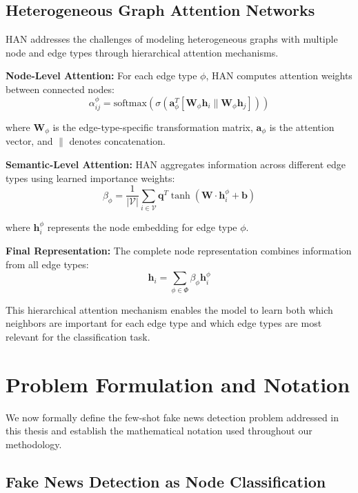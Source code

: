 \subsection{Heterogeneous Graph Attention Networks}

HAN addresses the challenges of modeling heterogeneous graphs with multiple node and edge types through hierarchical attention mechanisms.

\textbf{Node-Level Attention:} For each edge type $\phi$, HAN computes attention weights between connected nodes:
\begin{equation}
\alpha_{ij}^{\phi} = \text{softmax}\left(\sigma\left(\mathbf{a}_{\phi}^T [\mathbf{W}_{\phi} \mathbf{h}_i \| \mathbf{W}_{\phi} \mathbf{h}_j]\right)\right)
\end{equation}

where $\mathbf{W}_{\phi}$ is the edge-type-specific transformation matrix, $\mathbf{a}_{\phi}$ is the attention vector, and $\|$ denotes concatenation.

\textbf{Semantic-Level Attention:} HAN aggregates information across different edge types using learned importance weights:
\begin{equation}
\beta_{\phi} = \frac{1}{|\mathcal{V}|} \sum_{i \in \mathcal{V}} \mathbf{q}^T \tanh(\mathbf{W} \cdot \mathbf{h}_i^{\phi} + \mathbf{b})
\end{equation}

where $\mathbf{h}_i^{\phi}$ represents the node embedding for edge type $\phi$.

\textbf{Final Representation:} The complete node representation combines information from all edge types:
\begin{equation}
\mathbf{h}_i = \sum_{\phi \in \Phi} \beta_{\phi} \mathbf{h}_i^{\phi}
\end{equation}

This hierarchical attention mechanism enables the model to learn both which neighbors are important for each edge type and which edge types are most relevant for the classification task.

\section{Problem Formulation and Notation}

We now formally define the few-shot fake news detection problem addressed in this thesis and establish the mathematical notation used throughout our methodology.

\subsection{Fake News Detection as Node Classification}


